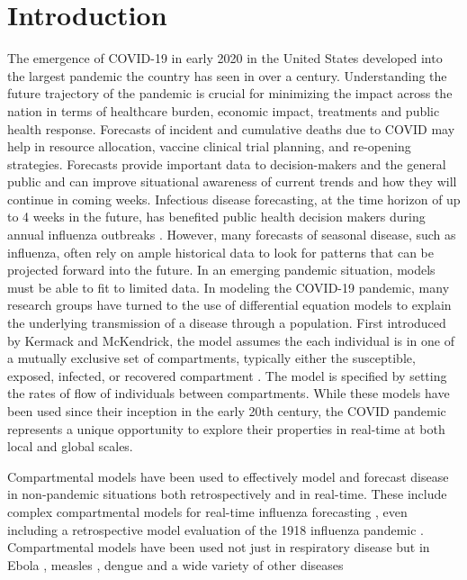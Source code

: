 \documentclass[11pt]{amsart}
\begin{document}

\section{Introduction}

The emergence of COVID-19 in early 2020 in the United States developed into the largest pandemic the country has seen in over a century. Understanding the future trajectory of the pandemic is crucial for minimizing the impact across the nation in terms of healthcare burden, economic impact, treatments and public health response. Forecasts of incident and cumulative deaths due to COVID may help in resource allocation, vaccine clinical trial planning, and re-opening strategies. Forecasts provide important data to decision-makers and the general public and can improve situational awareness of current trends and how they will continue in coming weeks. Infectious disease forecasting, at the time horizon of up to 4 weeks in the future, has benefited public health decision makers during annual influenza outbreaks \cite{lutz2019applying}\cite{myers2000forecasting}.  However, many forecasts of seasonal disease, such as influenza, often rely on ample historical data to look for patterns that can be projected forward into the future. In an emerging pandemic situation, models must be able to fit to limited data. In modeling the COVID-19 pandemic, many research groups have turned to the use of differential equation models to explain the underlying transmission of a disease through a population. First introduced by  Kermack and McKendrick, the model assumes the each individual is in one of a mutually exclusive set of compartments, typically either the susceptible, exposed, infected, or recovered compartment \cite{kermack1927contribution}. The model is specified by setting the rates of flow of individuals between compartments. While these models have been used since their inception in the early 20th century, the COVID pandemic represents a unique opportunity to explore their properties in real-time at both local and global scales.
 
Compartmental models have been used to effectively model and forecast disease in non-pandemic situations both retrospectively and in real-time. These include complex compartmental models for real-time influenza forecasting \cite{shaman2012forecasting}\cite{osthus2017forecasting}\cite{ong2010real}, even including a retrospective model evaluation of the 1918 influenza pandemic \cite{hall2007real}. Compartmental models have been used not just in respiratory disease but in Ebola \cite{lekone2006statistical}, measles \cite{bokler1993chaos}, dengue \cite{syafruddin2012seir} and a wide variety of other diseases
\end{document}
